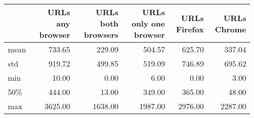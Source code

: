 \begin{tabular}{lrrrrr}
\toprule
{} &  URLs any browser &  URLs both browsers &  URLs  only one browser &  URLs Firefox &  URLs Chrome \\
\midrule
mean &            733.65 &              229.09 &                  504.57 &        625.70 &       337.04 \\
std  &            919.72 &              499.85 &                  519.09 &        746.89 &       695.62 \\
min  &             10.00 &                0.00 &                    6.00 &          0.00 &         3.00 \\
50\% &            444.00 &               13.00 &                  349.00 &        365.00 &        48.00 \\
max  &           3625.00 &             1638.00 &                 1987.00 &       2976.00 &      2287.00 \\
\bottomrule
\end{tabular}
